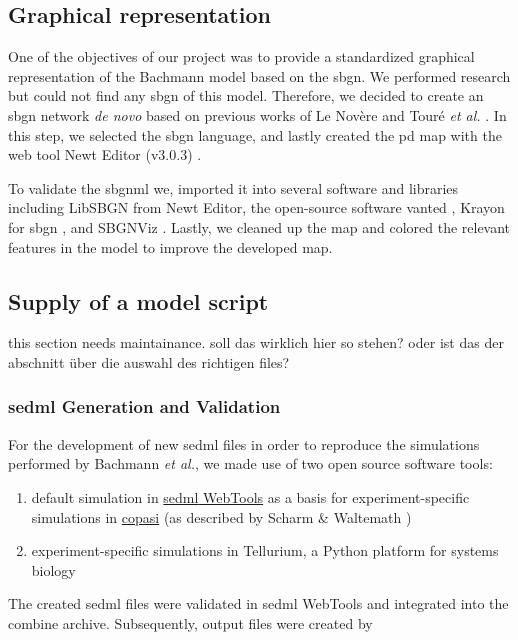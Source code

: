 \subsection*{Graphical representation}
One of the objectives of our project was to provide a standardized graphical representation of the Bachmann model based on the \ac{sbgn}. We performed research but could not find any \ac{sbgn} of this model. Therefore, we decided to create an \ac{sbgn} network \textit{de novo} based on previous works of Le Novère \cite{sbgnnovere} and Touré \textit{et al.} \cite{sbgntoure}. In this step, we selected the \ac{sbgn} language, and lastly created the \ac{pd} map with the web tool Newt Editor (v3.0.3) \cite{newteditor}. 

To validate the \ac{sbgnml} we, imported it into several software and libraries including LibSBGN from Newt Editor, the open-source software \ac{vanted} \cite{vanted}, Krayon for \ac{sbgn} \cite{krayon}, and SBGNViz \cite{sbgnviz}. Lastly, we cleaned up the map and colored the relevant features in the model to improve the developed map.

\subsection*{Supply of a model script}
\textsf{this section needs maintainance. soll das wirklich hier so stehen? oder ist das der abschnitt über die auswahl des richtigen files?}
\subsubsection*{\acs{sedml} Generation and Validation}
For the development of new \ac{sedml} files in order to reproduce the simulations performed by Bachmann \textit{et al.}, we made use of two open source software tools:
\begin{enumerate}
    \item default simulation in \hyperlink{http://sysbioapps.spdns.org/SED-ML_Web_Tools}{\ac{sedml} WebTools} as a basis for experiment-specific simulations in \hyperlink{http://copasi.org/}{\ac{copasi}} (as described by Scharm \& Waltemath \cite{combine})
    \item experiment-specific simulations in Tellurium, a Python platform for systems biology \cite{tellurium}
\end{enumerate}

The created \ac{sedml} files were validated in \ac{sedml} WebTools and integrated into the \ac{combine} archive. Subsequently, output files were created by

